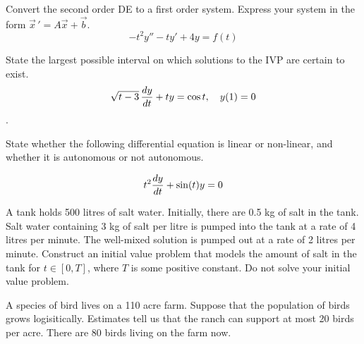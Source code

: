 \documentclass[12pt]{exam}
\begin{document}
    


\newpage


\InitialsRight

\begin{questions}

    \question[2] Convert the second order DE to a first order system. Express your system in the form $\vec x \, ' = A\vec x +\vec b$. 
    $$-t^2 y'' -ty'+4y = f(t)$$
    
    \vspace{6cm}
    
    \question[1] State the largest possible interval on which solutions to the IVP are certain to exist. $$\sqrt{t-3} \, {\frac{dy}{dt}} + t y = \cos t, \quad y(1) = 0$$.
    
    \vspace{4cm}
    
    \question[1] State whether the following differential equation is linear or non-linear, and whether it is autonomous or not autonomous. 
    
    $$t^2{\frac{dy}{dt}} + \sin(t) y = 0$$
    
    \newpage 
    
    \question[3]  A tank holds 500 litres of salt water. Initially, there are 0.5 kg of salt in the tank. Salt water containing 3 kg of salt per litre is pumped into the tank at a rate of 4 litres per minute. The well-mixed solution is pumped out at a rate of 2 litres per minute. Construct an initial value problem that models the amount of salt in the tank for $t\in[0,T]$, where $T$ is some positive constant. Do not solve your initial value problem. 
    
    \vspace{6cm}
    
    \question[3] A species of bird lives on a 110 acre farm. Suppose that  the population of birds grows logisitically. Estimates tell us that the ranch can support at most 20 birds per acre. There are 80 birds living on the farm now. 


\end{questions}
\end{document}
